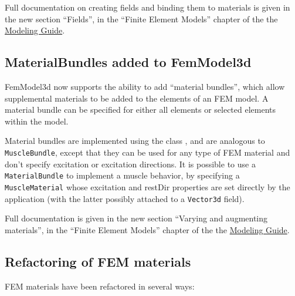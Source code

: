 \documentclass{article}
\begin{document}
Full documentation on creating fields and binding them to materials is
given in the new section ``Fields'', in the ``Finite Element Models''
chapter of the the
\href{http://www.artisynth.org/doc/info/modelguide/modelguide.html}
{Modeling Guide}.

\subsection*{MaterialBundles added to FemModel3d}

FemModel3d now supports the ability to add ``material bundles'', which
allow supplemental materials to be added to the elements of an FEM
model.  A material bundle can be specified for either all elements or
selected elements within the model. 

Material bundles are implemented using the class
, and are
analogous to {\tt MuscleBundle}, except that they can be used for any
type of FEM material and don't specify excitation or excitation
directions.  It is possible to use a {\tt MaterialBundle} to implement a
muscle behavior, by specifying a {\tt MuscleMaterial} whose {\sf
excitation} and {\sf restDir} properties are set directly by the
application (with the latter possibly attached to a {\tt Vector3d} field).

Full documentation is given in the new section ``Varying and
augmenting materials'', in the ``Finite Element Models'' chapter of
the the
\href{http://www.artisynth.org/doc/info/modelguide/modelguide.html}
{Modeling Guide}.

\subsection*{Refactoring of FEM materials}

FEM materials have been refactored in several ways:
\end{document}

